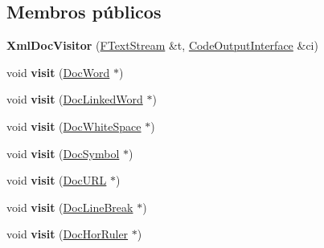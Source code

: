 \subsection*{Membros públicos}
\begin{DoxyCompactItemize}
\item 
\hypertarget{class_xml_doc_visitor_a4a94e3f44e96b033a00a6942bedc1e01}{{\bfseries Xml\-Doc\-Visitor} (\hyperlink{class_f_text_stream}{F\-Text\-Stream} \&t, \hyperlink{class_code_output_interface}{Code\-Output\-Interface} \&ci)}\label{class_xml_doc_visitor_a4a94e3f44e96b033a00a6942bedc1e01}

\item 
\hypertarget{class_xml_doc_visitor_ac60f6c2f041b955124e3ba6b63111ca5}{void {\bfseries visit} (\hyperlink{class_doc_word}{Doc\-Word} $\ast$)}\label{class_xml_doc_visitor_ac60f6c2f041b955124e3ba6b63111ca5}

\item 
\hypertarget{class_xml_doc_visitor_ab957281f81eaa9db582ac66f014ef342}{void {\bfseries visit} (\hyperlink{class_doc_linked_word}{Doc\-Linked\-Word} $\ast$)}\label{class_xml_doc_visitor_ab957281f81eaa9db582ac66f014ef342}

\item 
\hypertarget{class_xml_doc_visitor_a8e427da6441fcfec76f860101da1b132}{void {\bfseries visit} (\hyperlink{class_doc_white_space}{Doc\-White\-Space} $\ast$)}\label{class_xml_doc_visitor_a8e427da6441fcfec76f860101da1b132}

\item 
\hypertarget{class_xml_doc_visitor_aba7904fef0b15b1ff249f41815d3b739}{void {\bfseries visit} (\hyperlink{class_doc_symbol}{Doc\-Symbol} $\ast$)}\label{class_xml_doc_visitor_aba7904fef0b15b1ff249f41815d3b739}

\item 
\hypertarget{class_xml_doc_visitor_a38b6defe4c1e4aa2fb6bbc944f58f93c}{void {\bfseries visit} (\hyperlink{class_doc_u_r_l}{Doc\-U\-R\-L} $\ast$)}\label{class_xml_doc_visitor_a38b6defe4c1e4aa2fb6bbc944f58f93c}

\item 
\hypertarget{class_xml_doc_visitor_a1719b7dfc3a83b7976ff5997f56cd474}{void {\bfseries visit} (\hyperlink{class_doc_line_break}{Doc\-Line\-Break} $\ast$)}\label{class_xml_doc_visitor_a1719b7dfc3a83b7976ff5997f56cd474}

\item 
\hypertarget{class_xml_doc_visitor_aeed3d42f5e96c4016fbc6ab678f5549a}{void {\bfseries visit} (\hyperlink{class_doc_hor_ruler}{Doc\-Hor\-Ruler} $\ast$)}\label{class_xml_doc_visitor_aeed3d42f5e96c4016fbc6ab678f5549a}


\end{DoxyCompactItemize}
